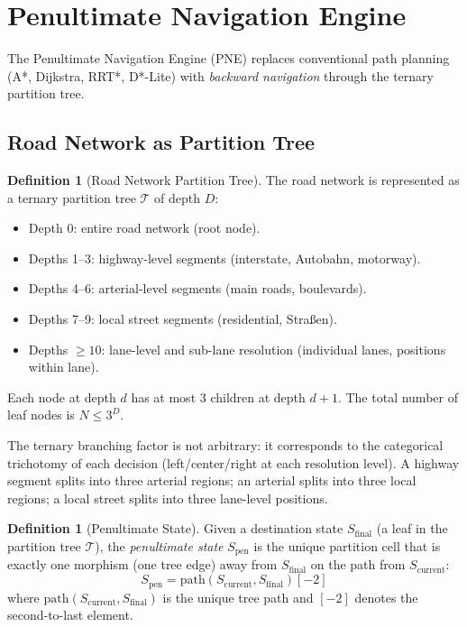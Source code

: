 \documentclass[twocolumn,10pt]{article}
\theoremstyle{definition}
\newtheorem{definition}[theorem]{Definition}
\newcommand{\Scurrent}{S_{\mathrm{current}}}
\newcommand{\Sfinal}{S_{\mathrm{final}}}
\newcommand{\Spen}{S_{\mathrm{pen}}}
\begin{document}
\section{Penultimate Navigation Engine}
\label{sec:pne}

The Penultimate Navigation Engine (PNE) replaces conventional path planning (A*, Dijkstra, RRT*, D*-Lite) with \emph{backward navigation} through the ternary partition tree.

\subsection{Road Network as Partition Tree}

\begin{definition}[Road Network Partition Tree]
\label{def:road-tree}
The road network is represented as a ternary partition tree $\mathcal{T}$ of depth $D$:
\begin{itemize}[leftmargin=*]
\item Depth 0: entire road network (root node).
\item Depths 1--3: highway-level segments (interstate, Autobahn, motorway).
\item Depths 4--6: arterial-level segments (main roads, boulevards).
\item Depths 7--9: local street segments (residential, Stra{\ss}en).
\item Depths $\geq 10$: lane-level and sub-lane resolution (individual lanes, positions within lane).
\end{itemize}
Each node at depth $d$ has at most 3 children at depth $d+1$. The total number of leaf nodes is $N \leq 3^D$.
\end{definition}

The ternary branching factor is not arbitrary: it corresponds to the categorical trichotomy of each decision (left/center/right at each resolution level). A highway segment splits into three arterial regions; an arterial splits into three local regions; a local street splits into three lane-level positions.

\begin{definition}[Penultimate State]
\label{def:penultimate}
Given a destination state $\Sfinal$ (a leaf in the partition tree $\mathcal{T}$), the \emph{penultimate state} $\Spen$ is the unique partition cell that is exactly one morphism (one tree edge) away from $\Sfinal$ on the path from $\Scurrent$:
\begin{equation}
\Spen = \mathrm{path}(\Scurrent, \Sfinal)[-2]
\end{equation}
where $\mathrm{path}(\Scurrent, \Sfinal)$ is the unique tree path and $[-2]$ denotes the second-to-last element.
\end{definition}
\end{document}
